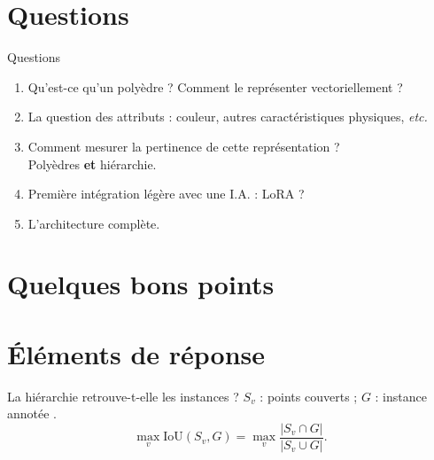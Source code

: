 \documentclass[svgnames,11pt,aspectratio=169]{beamer}
\newcommand{\IoU}{\mathrm{IoU}}
\newcommand{\partlabel}{}
\newcommand{\parttitle}{}
\newcommand{\presentationpart}[1]{%
  \section{#1}\gdef\partlabel{\Roman{section}.~#1}\gdef\parttitle{#1}%
  \begin{frame}\sectionpage\end{frame}}
\begin{document}
\presentationpart{Questions}

\begin{frame}{Questions}
\begin{enumerate}
\setlength{\itemsep}{.35cm}
\item Qu'est-ce qu'un polyèdre ? Comment le représenter vectoriellement ?
\item La question des attributs : couleur, autres caractéristiques physiques, \emph{etc.}
\item Comment mesurer la pertinence de cette représentation ?\\
      Polyèdres \textbf{et} hiérarchie.
\item Première intégration légère avec une I.A. : LoRA ? 
\item L'architecture complète.
\end{enumerate}
\end{frame}

\presentationpart{Quelques bons points}



\presentationpart{Éléments de réponse}



\begin{frame}{La hiérarchie retrouve-t-elle les instances ?}
\small $S_v$ : points couverts ; $G$ : instance annotée .
\[
\max_v\IoU(S_v,G)=\max_v\frac{|S_v\cap G|}{|S_v\cup G|}.
\]
\vspace{.05cm}
\begin{center}
\end{center}
\vspace{.15cm}
\normalsize

\end{frame}
\end{document}
